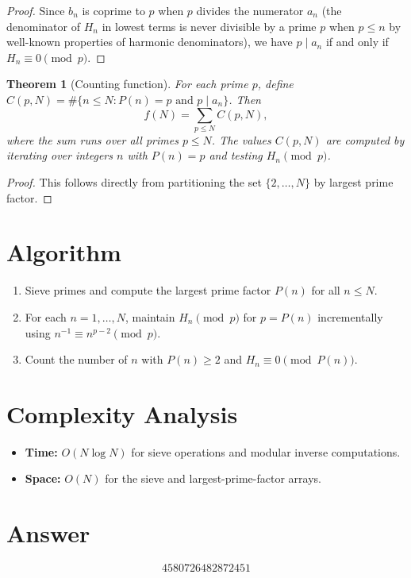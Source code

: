 \documentclass[11pt]{article}
\newtheorem{theorem}{Theorem}
\begin{document}
\begin{proof}
Since $b_n$ is coprime to $p$ when $p$ divides the numerator $a_n$ (the denominator of $H_n$ in lowest terms is never divisible by a prime $p$ when $p \le n$ by well-known properties of harmonic denominators), we have $p \mid a_n$ if and only if $H_n \equiv 0 \pmod{p}$.
\end{proof}

\begin{theorem}[Counting function]
For each prime $p$, define $C(p, N) = \#\{n \le N : P(n) = p \text{ and } p \mid a_n\}$. Then
\[
f(N) = \sum_{p \le N} C(p, N),
\]
where the sum runs over all primes $p \le N$. The values $C(p, N)$ are computed by iterating over integers $n$ with $P(n) = p$ and testing $H_n \pmod{p}$.
\end{theorem}

\begin{proof}
This follows directly from partitioning the set $\{2, \ldots, N\}$ by largest prime factor.
\end{proof}

\section{Algorithm}

\begin{enumerate}
\item Sieve primes and compute the largest prime factor $P(n)$ for all $n \le N$.
\item For each $n = 1, \ldots, N$, maintain $H_n \pmod{p}$ for $p = P(n)$ incrementally using $n^{-1} \equiv n^{p-2} \pmod{p}$.
\item Count the number of $n$ with $P(n) \ge 2$ and $H_n \equiv 0 \pmod{P(n)}$.
\end{enumerate}

\section{Complexity Analysis}

\begin{itemize}
\item \textbf{Time:} $O(N \log N)$ for sieve operations and modular inverse computations.
\item \textbf{Space:} $O(N)$ for the sieve and largest-prime-factor arrays.
\end{itemize}

\section{Answer}

\[
\boxed{4580726482872451}
\]
\end{document}
